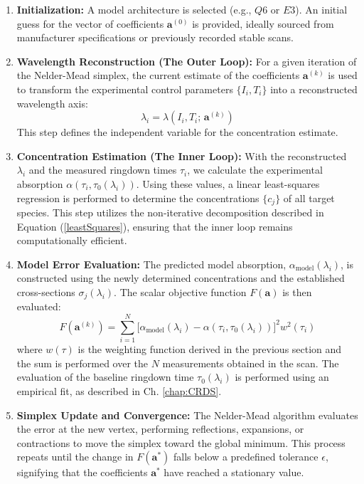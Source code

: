 \documentclass[8pt,a4paper]{report}
\begin{document}
	\begin{enumerate}
		\item \textbf{Initialization:} 
		A model architecture is selected (e.g., $Q6$ or $E3$). An initial guess for the vector of coefficients $\mathbf{a}^{(0)}$ is provided, ideally sourced from manufacturer specifications or previously recorded stable scans.
		
		\item \textbf{Wavelength Reconstruction (The Outer Loop):} 
		For a given iteration of the Nelder-Mead simplex, the current estimate of the coefficients $\mathbf{a}^{(k)}$ is used to transform the experimental control parameters $\{I_i, T_i\}$ into a reconstructed wavelength axis:
		\begin{equation}
			\lambda_i = \lambda(I_i, T_i;\, \mathbf{a}^{(k)})
		\end{equation}
		This step defines the independent variable for the concentration estimate.
		
		\item \textbf{Concentration Estimation (The Inner Loop):} 
		With the reconstructed $\lambda_i$ and the measured ringdown times $\tau_i$, we calculate the experimental absorption $\alpha(\tau_i, \tau_0(\lambda_i))$. Using these values, a linear least-squares regression is performed to determine the concentrations $\{c_j\}$ of all target species. This step utilizes the non-iterative decomposition described in Equation (\ref{leastSquares}), ensuring that the inner loop remains computationally efficient.
		
		\item \textbf{Model Error Evaluation:} 
		The predicted model absorption, $\alpha_\mathrm{model}(\lambda_i)$, is constructed using the newly determined concentrations and the established cross-sections $\sigma_j(\lambda_i)$. The scalar objective function $F(\mathbf{a})$ is then evaluated:
		\begin{equation}
			F(\mathbf{a}^{(k)}) = \sum_{i=1}^{N} \Big[\alpha_\mathrm{model}(\lambda_i) - \alpha(\tau_i, \tau_0(\lambda_i))\Big]^2 w^2(\tau_i)
		\end{equation}
		where $w(\tau)$ is the weighting function derived in the previous section and the sum is performed over the $N$ measurements obtained in the scan. The evaluation of the baseline ringdown time $\tau_0(\lambda_i)$ is performed using an empirical fit, as described in Ch. \ref{chap:CRDS}.
		
		\item \textbf{Simplex Update and Convergence:} 
		The Nelder-Mead algorithm evaluates the error at the new vertex, performing reflections, expansions, or contractions to move the simplex toward the global minimum. This process repeats until the change in $F(\mathbf{a}^*)$ falls below a predefined tolerance $\epsilon$, signifying that the coefficients $\mathbf{a}^*$ have reached a stationary value.
		

\end{enumerate}
\end{document}
